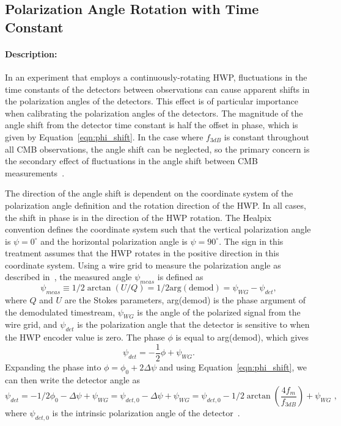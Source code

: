 \subsection{Polarization Angle Rotation with Time Constant}

\paragraph{Description:}
In an experiment that employs a continuously-rotating HWP, fluctuations in the time constants of the detectors between observations can cause apparent shifts in the polarization angles of the detectors. This effect is of particular importance when calibrating the polarization angles of the detectors. The magnitude of the angle shift from the detector time constant is half the offset in phase, which is given by Equation~\ref{eqn:phi_shift}. In the case where $f_{3dB}$ is constant throughout all CMB observations, the angle shift can be neglected, so the primary concern is the secondary effect of fluctuations in the angle shift between CMB measurements~\cite{Simon_Thesis_2016}.

The direction of the angle shift is dependent on the coordinate system of the polarization angle definition and the rotation direction of the HWP. In all cases, the shift in phase is in the direction of the HWP rotation. The Healpix convention defines the coordinate system such that the vertical polarization angle is $\psi=0^{\circ}$ and the horizontal polarization angle is $\psi=90^{\circ}$. The sign in this treatment assumes that the HWP rotates in the positive direction in this coordinate system. Using a wire grid to measure the polarization angle as described in~\cite{Tajima_2012}, the measured angle $\psi_{meas}$ is defined as
\begin{equation}
\psi_{meas} \equiv 1/2 \arctan{(U/Q)}=1/2\mathrm{arg(demod)}=\psi_{WG}-\psi_{det},
\end{equation}
where $Q$ and $U$ are the Stokes parameters, arg(demod) is the phase argument of the demodulated timestream, $\psi_{WG}$ is the angle of the polarized signal from the wire grid, and $\psi_{det}$ is the polarization angle that the detector is sensitive to when the HWP encoder value is zero. The phase $\phi$ is equal to arg(demod), which gives
\begin{equation}
\psi_{det}=-\frac{1}{2}\phi + \psi_{WG}.
\end{equation}
Expanding the phase into $\phi=\phi_{0}+2\Delta \psi$ and using Equation~\ref{eqn:phi_shift}, we can then write the detector angle as
\begin{equation}
\psi_{det}=-1/2\phi_{0}-\Delta \psi+ \psi_{WG}=\psi_{det,0}-\Delta \psi + \psi_{WG}=\psi_{det,0}-1/2\arctan{\left(\frac{4f_{m}}{f_{3dB}}\right)} + \psi_{WG}\,\, ,
\end{equation}
where $\psi_{det,0}$ is the intrinsic polarization angle of the detector~\cite{Simon_Thesis_2016}.

